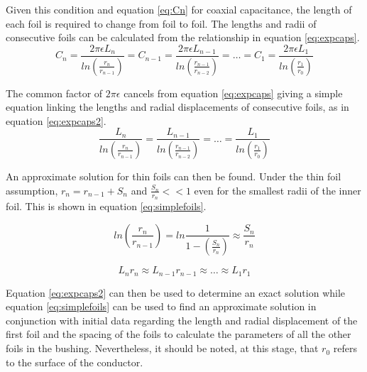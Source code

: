 Given this condition and equation \ref{eq:Cn} for coaxial capacitance, the length of each foil is required to change from foil to foil.
The lengths and radii of consecutive foils can be calculated from the relationship in equation \ref{eq:expcaps}.
\begin{equation}
   \label{eq:expcaps}
   C_n = \displaystyle\frac{2\pi\epsilon L_{n}}{ln(\displaystyle\frac{r_{n}}{r_{n-1}})} = C_{n-1} = \displaystyle\frac{2\pi\epsilon L_{n-1}}{ln(\displaystyle\frac{r_{n-1}}{r_{n-2}})} = \dots = C_{1} = \displaystyle\frac{2\pi\epsilon L_{1}}{ln(\displaystyle\frac{r_{1}}{r_{0}})}
\end{equation}

The common factor of $2\pi\epsilon$ cancels from equation \ref{eq:expcaps} giving a simple equation linking the lengths and radial displacements of consecutive foils, as in equation \ref{eq:expcaps2}.
\begin{equation}
   \label{eq:expcaps2}
   \displaystyle\frac{L_{n}}{ln(\displaystyle\frac{r_{n}}{r_{n-1}})} = \displaystyle\frac{ L_{n-1}}{ln(\displaystyle\frac{r_{n-1}}{r_{n-2}})} = \dots = \displaystyle\frac{ L_{1}}{ln(\displaystyle\frac{r_{1}}{r_{0}})}
\end{equation}

An approximate solution for thin foils can then be found.
Under the thin foil assumption, $r_{n} = r_{n-1} + S_n$ and $\displaystyle\frac{S_n}{r_n}<<1$ even for the smallest radii of the inner foil.
This is shown in equation \ref{eq:simplefoils}.

\begin{equation}
   \label{eq:simplify}
   ln(\displaystyle\frac{r_n}{r_{n-1}}) = ln\displaystyle\frac{1}{1-(\displaystyle\frac{S_n}{r_n})} \approx \displaystyle\frac{S_n}{r_n}
\end{equation}

\begin{equation}
   \label{eq:simplefoils}
   L_{n}r_{n} \approx L_{n-1}r_{n-1} \approx \dots \approx L_{1}r_{1}
\end{equation}

Equation \ref{eq:expcaps2} can then be used to determine an exact solution while equation \ref{eq:simplefoils} can be used to find an approximate solution in conjunction with initial data regarding the length and radial displacement of the first foil and the spacing of the foils to calculate the parameters of all the other foils in the bushing. Nevertheless, it should be noted, at this stage, that $r_0$ refers to the surface of the conductor.

